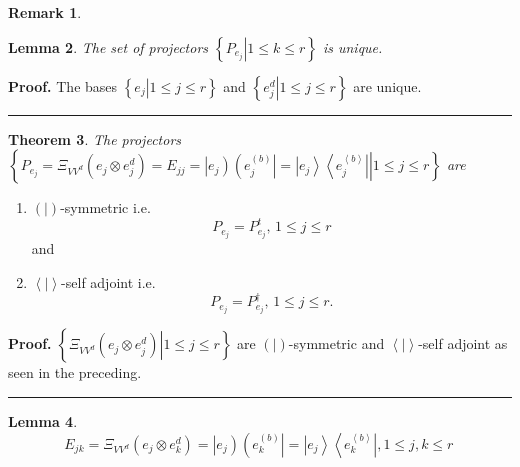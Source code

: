 \documentclass[aps,preprint]{revtex4}%
\newtheorem{theorem}{Theorem}
\newtheorem{lemma}[theorem]{Lemma}
\newtheorem{remark}[theorem]{Remark}
\newenvironment{proof}[1][Proof]{\noindent\textbf{#1.} }{\ \rule{0.5em}{0.5em}}
\begin{document}
\begin{remark}
\begin{enumerate}
\begin{enumerate}
\end{enumerate}
\end{enumerate}
\end{remark}

\begin{lemma}
The set of projectors $\left\{  \left.  P_{e_{j}}\right\vert 1\leq k\leq
r\right\}  $ is unique.
\end{lemma}

\begin{proof}
The bases $\left\{  \left.  e_{j}\right\vert 1\leq j\leq r\right\}  $ and
$\left\{  \left.  e_{j}^{d}\right\vert 1\leq j\leq r\right\}  $ are unique.
\end{proof}

\begin{theorem}
The projectors $\left\{  \left.  P_{e_{j}}=\Xi_{VV^{d}}\left(  e_{j}\otimes
e_{j}^{d}\right)  =E_{jj}=\left\vert e_{j}\right)  \left(  e_{j}^{\left(
b\right)  }\right\vert =\left\vert e_{j}\right\rangle \left\langle
e_{j}^{\left\langle b\right\rangle }\right\vert \right\vert 1\leq j\leq
r\right\}  $ are
\end{theorem}

\begin{enumerate}
\item $\left(  \left.  {}\right\vert \right)  $-symmetric i.e.
\begin{equation}
P_{e_{j}}=P_{e_{j}}^{t},\,1\leq j\leq r
\end{equation}
and

\item $\left\langle \left.  {}\right\vert \right\rangle $-self adjoint i.e.
\begin{equation}
P_{e_{j}}=P_{e_{j}}^{\dagger},\,1\leq j\leq r.
\end{equation}

\end{enumerate}

\begin{proof}
$\left\{  \left.  \Xi_{VV^{d}}\left(  e_{j}\otimes e_{j}^{d}\right)
\right\vert 1\leq j\leq r\right\}  $ are $\left(  \left.  {}\right\vert
\right)  $-symmetric and $\left\langle \left.  {}\right\vert \right\rangle
$-self adjoint as seen in the preceding.
\end{proof}

\begin{lemma}%
\begin{equation}
E_{jk}=\Xi_{VV^{d}}\left(  e_{j}\otimes e_{k}^{d}\right)  =\left\vert
e_{j}\right)  \left(  e_{k}^{\left(  b\right)  }\right\vert =\left\vert
e_{j}\right\rangle \left\langle e_{k}^{\left\langle b\right\rangle
}\right\vert ,1\leq j,k\leq r\,
\end{equation}

\end{lemma}
\end{document}
